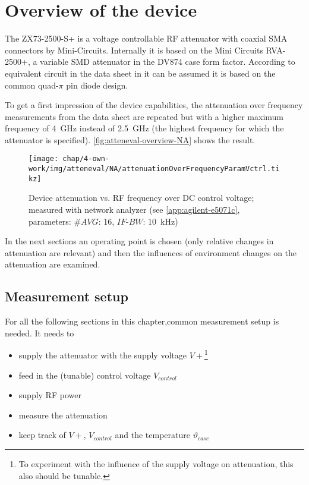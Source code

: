 \FloatBarrier
\section{Overview of the device}
The ZX73-2500-S+ is a voltage controllable RF attenuator with coaxial SMA connectors by Mini-Circuits. Internally it is based on the Mini Circuits RVA-2500+, a variable SMD attenuator in the DV874 case form factor. According to equivalent circuit in the data sheet in \cite{mini-circuitsZX732500VoltageVariable} it can be assumed it is based on the common quad-$\pi$ pin diode design\cite{waughLowCostSurfaceMount1992}.

To get a first impression of the device capabilities, the attenuation over frequency measurements from the data sheet are repeated but with a higher maximum frequency of \SI{4}{\GHz} instead of \SI{2.5}{\GHz} (the highest frequency for which the attenuator is specified). \autoref{fig:atteneval-overview-NA} shows the result.

\begin{figure}[tb]
	\centering
	\texttt{[image: chap/4-own-work/img/atteneval/NA/attenuationOverFrequencyParamVctrl.tikz]}
	\caption{Device attenuation vs. RF frequency over DC control voltage;\\ measured with network analyzer (see \ref{app:agilent-e5071c}, parameters: $\#AVG$: 16, $IF\text{-}BW$: \SI{10}{\kHz})}
	\label{fig:atteneval-overview-NA}
\end{figure}

In the next sections an operating point is chosen (only relative changes in attenuation are relevant) and then the influences of environment changes on the attenuation are examined.

\FloatBarrier
\subsection{Measurement setup}
For all the following sections in this chapter,common measurement setup is needed. It needs to
\begin{itemize}
\item supply the attenuator with the supply voltage $V+$\footnote{To experiment with the influence of the supply voltage on attenuation, this also should be tunable.}
\item feed in the (tunable) control voltage $V_{control}$
\item supply RF power
\item measure the attenuation
\item keep track of $V+$, $V_{control}$ and the temperature $\vartheta_{case}$
\end{itemize}

